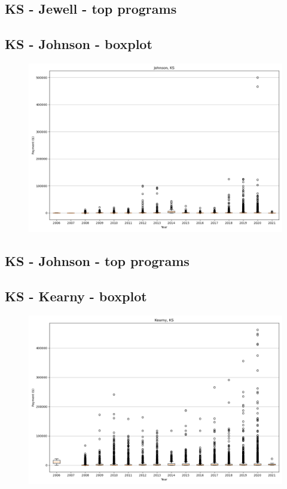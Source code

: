 \subsection*{KS - Jewell - top programs}

\newpage
\subsection*{KS - Johnson - boxplot}
\begin{figure}[h]
\centering
\includegraphics[width=7in]{../output/boxplots/counties/Johnson-KS_boxplot.png}
\end{figure}


\subsection*{KS - Johnson - top programs}

\newpage
\subsection*{KS - Kearny - boxplot}
\begin{figure}[h]
\centering
\includegraphics[width=7in]{../output/boxplots/counties/Kearny-KS_boxplot.png}
\end{figure}


